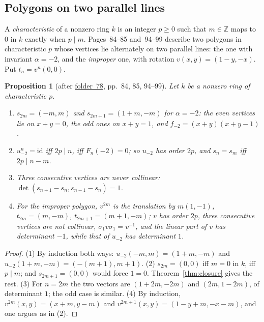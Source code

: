 \documentclass[11pt,a4paper]{amsart}
\newtheorem{proposition}[theorem]{Proposition}
\theoremstyle{definition}
\theoremstyle{remark}
\newcommand{\Z}{\mathbb Z}
\newcommand{\id}{\mathrm{id}}
\newcommand{\fac}[1]{\href{https://grothendieck.umontpellier.fr/#1.pdf}{folder~#1}}
\begin{document}
\subsection*{Polygons on two parallel lines}
A \emph{characteristic} of a nonzero ring $k$ is an integer $p \ge 0$ such that $m \in \Z$ maps to $0$ in $k$ exactly when $p \mid m$. Pages~84--85 and~94--99 describe two polygons in characteristic $p$ whose vertices lie alternately on two parallel lines: the one with invariant $\alpha = -2$, and the \emph{improper} one, with rotation $v(x,y) = (1 - y, -x)$. Put $t_n = v^n(0,0)$.

\begin{proposition}[after \fac{78}, pp.~84, 85, 94--99]\label{prop:strip}
Let $k$ be a nonzero ring of characteristic $p$.
\begin{enumerate}
\item $s_{2m} = (-m, m)$ and $s_{2m+1} = (1+m, -m)$ for $\alpha = -2$: the even vertices lie on $x + y = 0$, the odd ones on $x + y = 1$, and $f_{-2} = (x+y)(x+y-1)$.
\item $u_{-2}^n = \id$ iff $2p \mid n$, iff $F_n(-2) = 0$; so $u_{-2}$ has order $2p$, and $s_n = s_m$ iff $2p \mid n - m$.
\item Three consecutive vertices are never collinear: $\det(s_{n+1} - s_n, s_{n-1} - s_n) = 1$.
\item For the improper polygon, $v^{2m}$ is the translation by $m(1,-1)$, $t_{2m} = (m, -m)$, $t_{2m+1} = (m+1, -m)$; $v$ has order $2p$, three consecutive vertices are not collinear, $\sigma_1 v\sigma_1 = v^{-1}$, and the linear part of $v$ has determinant $-1$, while that of $u_{-2}$ has determinant $1$.
\end{enumerate}
\end{proposition}

\begin{proof}
(1) By induction both ways: $u_{-2}(-m, m) = (1+m, -m)$ and $u_{-2}(1+m, -m) = (-(m+1), m+1)$. (2) $s_{2m} = (0,0)$ iff $m = 0$ in $k$, iff $p \mid m$; and $s_{2m+1} = (0,0)$ would force $1 = 0$. Theorem~\ref{thm:closure} gives the rest. (3) For $n = 2m$ the two vectors are $(1+2m, -2m)$ and $(2m, 1-2m)$, of determinant $1$; the odd case is similar. (4) By induction, $v^{2m}(x,y) = (x+m, y-m)$ and $v^{2m+1}(x,y) = (1-y+m, -x-m)$, and one argues as in (2).
\end{proof}
\end{document}
